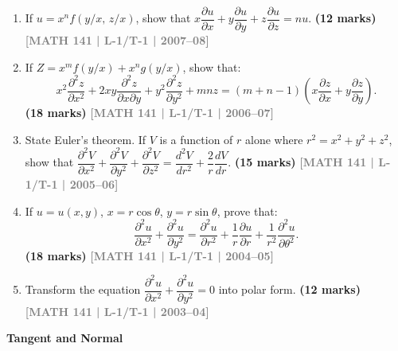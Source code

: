 \documentclass[12pt,a4paper]{article}
\newcommand{\yr}[1]{\hfill\textcolor{gray}{\small\textbf{[#1]}}}
\newcommand{\mk}[1]{\textcolor{orange!70!black}{\small\textbf{(#1 marks)}}}
\newcommand{\subtopic}[2]{%
  \vspace{10pt}
  \noindent\begin{tcolorbox}[colback=#1!8,colframe=#1,boxrule=0.6pt,arc=4pt,
    left=6pt,right=6pt,top=4pt,bottom=4pt]
    \small\bfseries\textcolor{#1}{#2}
  \end{tcolorbox}
  \vspace{2pt}
}
\begin{document}
\begin{enumerate}
\item If $u=x^{n}f(y/x,\,z/x)$, show that $x\dfrac{\partial u}{\partial x}+y\dfrac{\partial u}{\partial y}+z\dfrac{\partial u}{\partial z}=nu$.
\mk{12} \yr{MATH 141 | L-1/T-1 | 2007--08}

\item If $Z=x^{m}f(y/x)+x^{n}g(y/x)$, show that:
\[
x^{2}\frac{\partial^{2}z}{\partial x^{2}}+2xy\frac{\partial^{2}z}{\partial x\partial y}+y^{2}\frac{\partial^{2}z}{\partial y^{2}}+mnz=(m+n-1)\!\left(x\frac{\partial z}{\partial x}+y\frac{\partial z}{\partial y}\right).
\]
\mk{18} \yr{MATH 141 | L-1/T-1 | 2006--07}

\item State Euler's theorem. If $V$ is a function of $r$ alone where $r^{2}=x^{2}+y^{2}+z^{2}$, show that $\dfrac{\partial^{2}V}{\partial x^{2}}+\dfrac{\partial^{2}V}{\partial y^{2}}+\dfrac{\partial^{2}V}{\partial z^{2}}=\dfrac{d^{2}V}{dr^{2}}+\dfrac{2}{r}\dfrac{dV}{dr}$.
\mk{15} \yr{MATH 141 | L-1/T-1 | 2005--06}

\item If $u=u(x,y)$, $x=r\cos\theta$, $y=r\sin\theta$, prove that:
\[
\frac{\partial^{2}u}{\partial x^{2}}+\frac{\partial^{2}u}{\partial y^{2}}=\frac{\partial^{2}u}{\partial r^{2}}+\frac{1}{r}\frac{\partial u}{\partial r}+\frac{1}{r^{2}}\frac{\partial^{2}u}{\partial\theta^{2}}.
\]
\mk{18} \yr{MATH 141 | L-1/T-1 | 2004--05}

\item Transform the equation $\dfrac{\partial^{2}u}{\partial x^{2}}+\dfrac{\partial^{2}u}{\partial y^{2}}=0$ into polar form.
\mk{12} \yr{MATH 141 | L-1/T-1 | 2003--04}

\end{enumerate}

\subtopic{cA}{Tangent and Normal}
\label{sub:s1-tangnorm}
\end{document}
